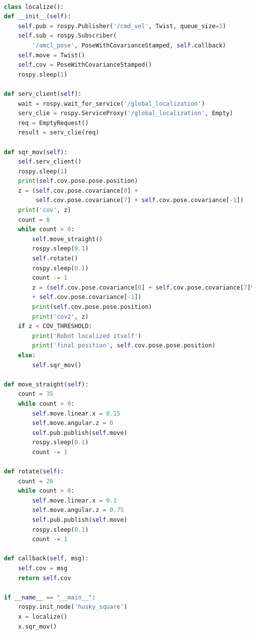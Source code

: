 \documentclass[a4paper,twoside]{article}
\begin{document}
\newpage
\begin{lstlisting}[language=python, caption=位置重定位代码]
	
class localize():
def __init__(self):
	self.pub = rospy.Publisher('/cmd_vel', Twist, queue_size=1)
	self.sub = rospy.Subscriber(
		'/amcl_pose', PoseWithCovarianceStamped, self.callback)
	self.move = Twist()
	self.cov = PoseWithCovarianceStamped()
	rospy.sleep(1)

def serv_client(self):
	wait = rospy.wait_for_service('/global_localization')
	serv_clie = rospy.ServiceProxy('/global_localization', Empty)
	req = EmptyRequest()
	result = serv_clie(req)

def sqr_mov(self):
	self.serv_client()
	rospy.sleep(1)
	print(self.cov.pose.pose.position)
	z = (self.cov.pose.covariance[0] +
		 self.cov.pose.covariance[7] + self.cov.pose.covariance[-1])
	print('cov', z)
	count = 8
	while count > 0:
		self.move_straight()
		rospy.sleep(0.1)
		self.rotate()
		rospy.sleep(0.1)
		count -= 1
		z = (self.cov.pose.covariance[0] + self.cov.pose.covariance[7]\
		+ self.cov.pose.covariance[-1])
		print(self.cov.pose.pose.position)
		print('cov2', z)
	if z < COV_THRESHOLD:
		print('Robot localized itself')
		print('final position', self.cov.pose.pose.position)
	else:
		self.sqr_mov()

def move_straight(self):
	count = 35
	while count > 0:
		self.move.linear.x = 0.15
		self.move.angular.z = 0
		self.pub.publish(self.move)
		rospy.sleep(0.1)
		count -= 1

def rotate(self):
	count = 26
	while count > 0:
		self.move.linear.x = 0.1
		self.move.angular.z = 0.75
		self.pub.publish(self.move)
		rospy.sleep(0.1)
		count -= 1

def callback(self, msg):
	self.cov = msg
	return self.cov

if __name__ == "__main__":
	rospy.init_node('husky_square')
	x = localize()
	x.sqr_mov()
\end{lstlisting}
\newpage
\end{document}
